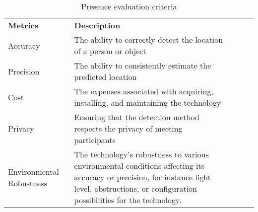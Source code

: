 \begin{table}[H]
    \begin{tabular}{|l|p{85mm}|lll}
    \cline{1-2}
    \textbf{Metrics} & \textbf{Description}                                                               &  &  &  \\ \cline{1-2}
    Accuracy         & The ability to correctly detect the location of a person or object     &  &  &  \\ \cline{1-2}
    Precision        & The ability to consistently estimate the predicted location                           &  &  &  \\ \cline{1-2}
    Cost             & The expenses associated with acquiring, installing, and maintaining the technology &  &  &  \\ \cline{1-2}
    Privacy          & Ensuring that the detection method respects the privacy of meeting participants    &  &  &  \\ \cline{1-2}
    Environmental Robustness    & The technology's robustness to various environmental conditions affecting its accuracy or precision, for instance light level, obstructions, or configuration possibilities for the technology.                     &  &  &  \\ \cline{1-2}
    \end{tabular}
    \caption{Presence evaluation criteria}
    \label{lst:presence_eval_criteria}
\end{table}
